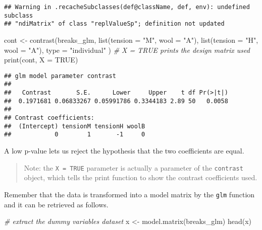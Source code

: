 \documentclass[
  oneside]{book}
\newenvironment{Shaded}{\begin{snugshade}}{\end{snugshade}}
\newcommand{\AttributeTok}[1]{\textcolor[rgb]{0.77,0.63,0.00}{#1}}
\newcommand{\CommentTok}[1]{\textcolor[rgb]{0.56,0.35,0.01}{\textit{#1}}}
\newcommand{\ConstantTok}[1]{\textcolor[rgb]{0.00,0.00,0.00}{#1}}
\newcommand{\FunctionTok}[1]{\textcolor[rgb]{0.00,0.00,0.00}{#1}}
\newcommand{\NormalTok}[1]{#1}
\newcommand{\OtherTok}[1]{\textcolor[rgb]{0.56,0.35,0.01}{#1}}
\newcommand{\StringTok}[1]{\textcolor[rgb]{0.31,0.60,0.02}{#1}}
\begin{document}
\begin{verbatim}
## Warning in .recacheSubclasses(def@className, def, env): undefined subclass
## "ndiMatrix" of class "replValueSp"; definition not updated
\end{verbatim}

\begin{Shaded}
\begin{Highlighting}[]
\NormalTok{cont }\OtherTok{\textless{}{-}} \FunctionTok{contrast}\NormalTok{(breaks\_glm,}
  \FunctionTok{list}\NormalTok{(}\AttributeTok{tension =} \StringTok{"M"}\NormalTok{, }\AttributeTok{wool =} \StringTok{"A"}\NormalTok{),}
  \FunctionTok{list}\NormalTok{(}\AttributeTok{tension =} \StringTok{"H"}\NormalTok{, }\AttributeTok{wool =} \StringTok{"A"}\NormalTok{),}
  \AttributeTok{type =} \StringTok{"individual"}
\NormalTok{)}
\CommentTok{\# X = TRUE prints the design matrix used}
\FunctionTok{print}\NormalTok{(cont, }\AttributeTok{X =} \ConstantTok{TRUE}\NormalTok{)}
\end{Highlighting}
\end{Shaded}

\begin{verbatim}
## glm model parameter contrast
## 
##   Contrast       S.E.      Lower     Upper    t df Pr(>|t|)
##  0.1971681 0.06833267 0.05991786 0.3344183 2.89 50   0.0058
## 
## Contrast coefficients:
##  (Intercept) tensionM tensionH woolB
##            0        1       -1     0
\end{verbatim}

A low p-value lets us reject the hypothesis that the two coefficients
are equal.

\begin{quote}
Note: the \texttt{X\ =\ TRUE} parameter is actually a parameter of the
\texttt{contrast} object, which tells the print function to show the
contrast coefficients used.
\end{quote}

Remember that the data is transformed into a model matrix
by the \texttt{glm} function and it can be retrieved as follows.

\begin{Shaded}
\begin{Highlighting}[]
\CommentTok{\# extract the dummy variables dataset}
\NormalTok{x }\OtherTok{\textless{}{-}} \FunctionTok{model.matrix}\NormalTok{(breaks\_glm)}
\FunctionTok{head}\NormalTok{(x)}
\end{Highlighting}
\end{Shaded}
\end{document}
